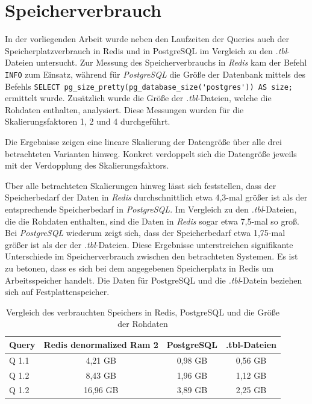 \section{Speicherverbrauch}
In der vorliegenden Arbeit wurde neben den Laufzeiten der Queries auch der Speicherplatzverbrauch in Redis und in PostgreSQL im Vergleich zu den \emph{.tbl}-Dateien untersucht. Zur Messung des Speicherverbrauchs in \emph{Redis} kam der Befehl \lstinline|INFO| zum Einsatz, während für \emph{PostgreSQL} die Größe der Datenbank mittels des Befehls \lstinline|SELECT pg_size_pretty(pg_database_size('postgres')) AS size;| ermittelt wurde. Zusätzlich wurde die Größe der \emph{.tbl}-Dateien, welche die Rohdaten enthalten, analysiert. Diese Messungen wurden für die Skalierungsfaktoren 1, 2 und 4 durchgeführt.

Die Ergebnisse zeigen eine lineare Skalierung der Datengröße über alle drei betrachteten Varianten hinweg. Konkret verdoppelt sich die Datengröße jeweils mit der Verdopplung des Skalierungsfaktors.

Über alle betrachteten Skalierungen hinweg lässt sich feststellen, dass der Speicherbedarf der Daten in \emph{Redis} durchschnittlich etwa 4,3-mal größer ist als der entsprechende Speicherbedarf in \emph{PostgreSQL}. Im Vergleich zu den \emph{.tbl}-Dateien, die die Rohdaten enthalten, sind die Daten in \emph{Redis} sogar etwa 7,5-mal so groß. Bei \emph{PostgreSQL} wiederum zeigt sich, dass der Speicherbedarf etwa 1,75-mal größer ist als der der \emph{.tbl}-Dateien. Diese Ergebnisse unterstreichen signifikante Unterschiede im Speicherverbrauch zwischen den betrachteten Systemen.
Es ist zu betonen, dass es sich bei dem angegebenen Speicherplatz in Redis um Arbeitsspeicher handelt. Die Daten für PostgreSQL und die \emph{.tbl}-Datein beziehen sich auf Festplattenspeicher.

\begin{table}[h]
\centering
\begin{tabular}{lccc}
\hline
Query & Redis denormalized Ram 2 & PostgreSQL & .tbl-Dateien\\ \hline
Q 1.1 & 4,21 GB & 0,98 GB  & 0,56 GB       \\
Q 1.2 & 8,43 GB & 1,96 GB    & 1,12 GB       \\ 
Q 1.2 & 16,96 GB & 3,89 GB    & 2,25 GB       \\ \hline
\end{tabular}
\caption{Vergleich des verbrauchten Speichers in Redis, PostgreSQL und die Größe der Rohdaten}
\label{tab:storage}
\end{table}

